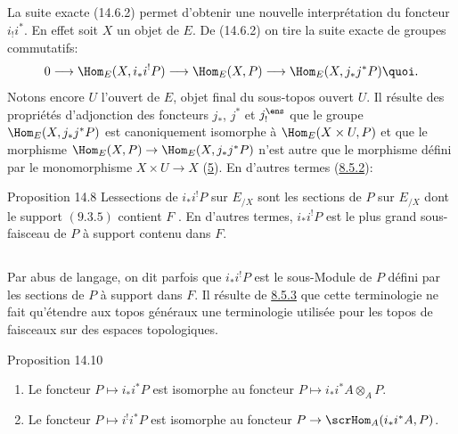 \subsection{}
La suite exacte (14.6.2) permet d'obtenir une nouvelle
interprétation du foncteur $i_{!}i^{\ast}$. En effet soit $X$ un
objet de $E$. De (14.6.2) on tire la suite exacte de groupes
commutatifs:
$$
0\longrightarrow \Hom_E(X,i_{\ast}i^{!}P)\longrightarrow
\Hom_E(X,P)\longrightarrow \Hom_E(X,j_{\ast}j^{\ast}P){\quoi}.
$$
Notons encore $U$ l'ouvert de $E$, objet final du sous-topos ouvert
$U$. Il résulte des propriétés d'adjonction des foncteurs
$j_{\ast}$, $j^{\ast}$ et $j_{!}^{\ens}$ que le groupe
$\Hom_E(X,j_{\ast}j^{\ast}P)$ est canoniquement isomorphe à
$\Hom_E(X\times U,P)$ et que le morphisme $\Hom_E(X,P)\rightarrow
\Hom_E(X,j_{\ast}j^{\ast}P)$ n'est autre que le morphisme défini par
le monomorphisme $X\times U\rightarrow X$ (\hyperref[IV.sec5]{5}). En
d'autres termes (\hyperref[IV.subsubsec8.5.2]{8.5.2}):

\begin{enonce*}{Proposition 14.8}
Les\pageoriginale sections de $i_{\ast}i^{!}P$ sur $E_{/X}$ sont les
sections de $P$ sur $E_{/X}$ dont le support
$(\hyperref[IV.subsubsec9.3.5]{9.3.5})$ contient $F$ . En
d'autres termes, $i_{\ast}i^{!}P$ est le plus grand sous-faisceau de
$P$ à support contenu dans $F$.
\end{enonce*}

\setcounter{subsection}{8}
\subsection{}
Par abus de langage, on dit parfois que $i_{\ast}i^{!}P$ est le
sous-Module de $P$ défini par les sections de $P$ à support dans
$F$. Il résulte de \hyperref[IV.rem8.5.3]{8.5.3} que cette terminologie ne fait
qu'étendre aux topos généraux une terminologie
utilisée pour les
topos de faisceaux sur des espaces topologiques.

\begin{enonce*}{Proposition 14.10}
\begin{enumerate}
\renewcommand{\labelenumi}{\theenumi)}
\item Le foncteur $P\mapsto i_{\ast}i^{\ast}P$ est isomorphe au
foncteur $P\mapsto i_{\ast}i^{\ast}A\otimes_A P$.

\item Le foncteur $P\mapsto i^{!}i^{\ast}P$ est isomorphe au foncteur
$P\rightarrow \scrHom_A(i_{\ast}i^{\ast}A,P)$.
\end{enumerate}
\end{enonce*}

